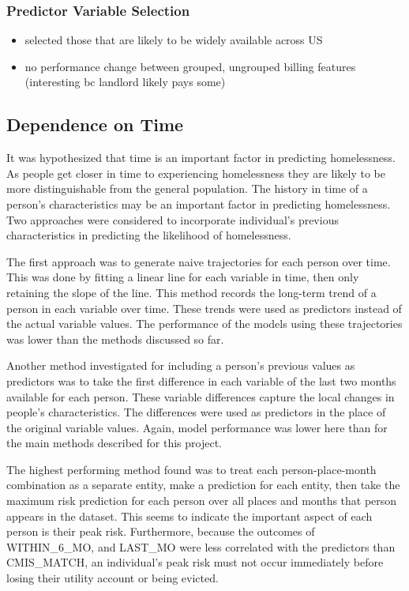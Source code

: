 \documentclass[10pt,letterpaper]{article}
\begin{document}
\subsubsection*{Predictor Variable Selection}
\begin{itemize}
    \item selected those that are likely to be widely available across US
    \item no performance change between grouped, ungrouped billing features (interesting bc landlord likely pays some)
\end{itemize}

\subsection*{Dependence on Time}
It was hypothesized that time is an important factor in predicting homelessness. As people get closer in time to experiencing homelessness they are likely to be more distinguishable from the general population. The history in time of a person's characteristics may be an important factor in predicting homelessness. Two approaches were considered to incorporate individual's previous characteristics in predicting the likelihood of homelessness.

The first approach was to generate naive trajectories for each person over time. This was done by fitting a linear line for each variable in time, then only retaining the slope of the line. This method records the long-term trend of a person in each variable over time. These trends were used as predictors instead of the actual variable values. The performance of the models using these trajectories was lower than the methods discussed so far.

Another method investigated for including a person's previous values as predictors was to take the first difference in each variable of the last two months available for each person. These variable differences capture the local changes in people's characteristics. The differences were used as predictors in the place of the original variable values. Again, model performance was lower here than for the main methods described for this project.

The highest performing method found was to treat each person-place-month combination as a separate entity, make a prediction for each entity, then take the maximum risk prediction for each person over all places and months that person appears in the dataset. This seems to indicate the important aspect of each person is their peak risk. Furthermore, because the outcomes of WITHIN\_6\_MO, and LAST\_MO were less correlated with the predictors than CMIS\_MATCH, an individual's peak risk must not occur immediately before losing their utility account or being evicted. 
\end{document}
